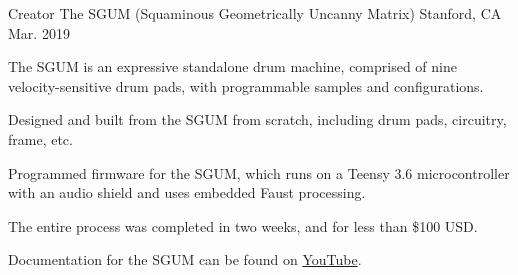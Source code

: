 \begin{cventries}

  \cventry
    {Creator} %
    {The SGUM (Squaminous Geometrically Uncanny Matrix)} %
    {Stanford, CA} %
    {Mar. 2019} %
    {
      \begin{cvitems} %
        \item {The SGUM is an expressive standalone drum machine, comprised of nine velocity-sensitive drum pads, with programmable samples and configurations.}
        \item {Designed and built from the SGUM from scratch, including drum pads, circuitry, frame, etc.}
        \item {Programmed firmware for the SGUM, which runs on a Teensy 3.6 microcontroller with an audio shield and uses embedded Faust processing.}
        \item {The entire process was completed in two weeks, and for less than \$100 USD.}
        \item {Documentation for the SGUM can be found on \href{https://www.youtube.com/watch?v=NOcPRS4LxpQ}{YouTube}.}
      \end{cvitems}
    }



\end{cventries}
